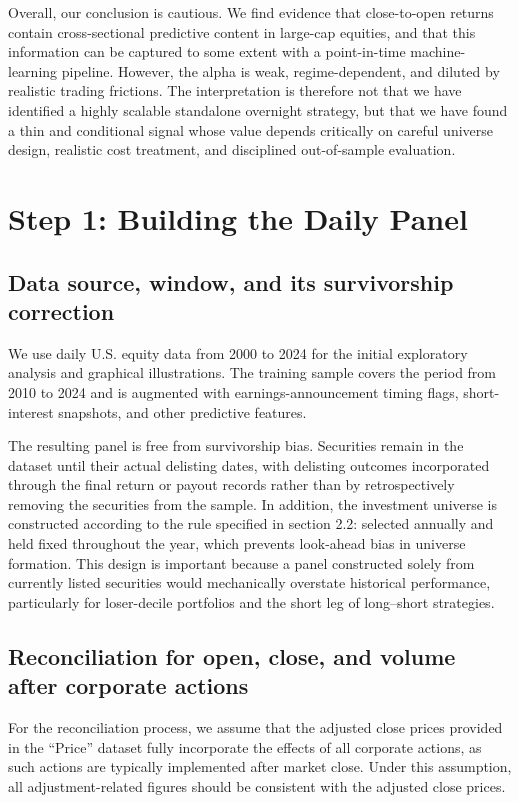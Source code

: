 \documentclass[12pt]{article}
\begin{document}
Overall, our conclusion is cautious. We find evidence that close-to-open returns contain cross-sectional predictive content in large-cap equities, and that this information can be captured to some extent with a point-in-time machine-learning pipeline. However, the alpha is weak, regime-dependent, and diluted by realistic trading frictions. The interpretation is therefore not that we have identified a highly scalable standalone overnight strategy, but that we have found a thin and conditional signal whose value depends critically on careful universe design, realistic cost treatment, and disciplined out-of-sample evaluation.
\section{Step 1: Building the Daily Panel }

\subsection{Data source, window, and its survivorship correction}

We use daily U.S. equity data from 2000 to 2024 for the initial exploratory analysis and graphical illustrations. The training sample covers the period from 2010 to 2024 and is augmented with earnings-announcement timing flags, short-interest snapshots, and other predictive features.

The resulting panel is free from survivorship bias. Securities remain in the dataset until their actual delisting dates, with delisting outcomes incorporated through the final return or payout records rather than by retrospectively removing the securities from the sample. In addition, the investment universe is constructed according to the rule specified in section 2.2: selected annually and held fixed throughout the year, which prevents look-ahead bias in universe formation. This design is important because a panel constructed solely from currently listed securities would mechanically overstate historical performance, particularly for loser-decile portfolios and the short leg of long–short strategies.

\subsection{Reconciliation for open, close, and volume after corporate actions }
For the reconciliation process, we assume that the adjusted close prices provided in the “Price” dataset fully incorporate the effects of all corporate actions, as such actions are typically implemented after market close. Under this assumption, all adjustment-related figures should be consistent with the adjusted close prices.
\end{document}
